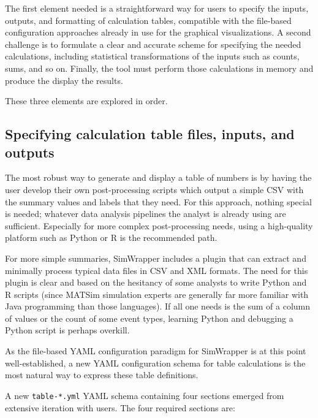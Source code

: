 The first element needed is a straightforward way for users to specify the inputs, outputs, and formatting of calculation tables, compatible with the file-based configuration approaches already in use for the graphical visualizations. A second challenge is to formulate a clear and accurate scheme for specifying the needed calculations, including statistical transformations of the inputs such as counts, sums, and so on. Finally, the tool must perform those calculations in memory and produce the display the results.

These three elements are explored in order.


\hypertarget{simwrapper-calculation-tables-definition}{%
\subsection{Specifying calculation table files, inputs, and outputs }\label{calculation-tables-definition}}

The most robust way to generate and display a table of numbers is by having the user develop their own post-processing scripts which output a simple CSV with the summary values and labels that they need. For this approach, nothing special is needed; whatever data analysis pipelines the analyst is already using are sufficient. Especially for more complex post-processing needs, using a high-quality platform such as Python or R is the recommended path.

For more simple summaries, SimWrapper includes a plugin that can extract and minimally process typical data files in CSV and XML formats. The need for this plugin is clear and based on the hesitancy of some analysts to write Python and R scripts (since MATSim simulation experts are generally far more familiar with Java programming than those languages). If all one needs is the sum of a column of values or the count of some event types, learning Python and debugging a Python script is perhaps overkill.

As the file-based YAML configuration paradigm for SimWrapper is at this point well-established, a new YAML configuration schema for table calculations is the most natural way to express these table definitions.

A new \texttt{table-*.yml} YAML schema containing four sections emerged from extensive iteration with users. The four required sections are:

